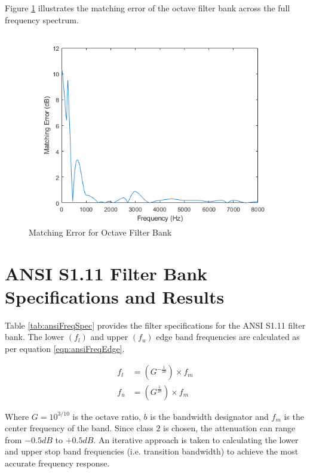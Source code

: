 \documentclass[11pt,onecolumn]{witseiepaper}
\begin{document}
\begin{appendices}
\noindent Figure \ref{fig:octMatErr} illustrates the matching error of the octave filter bank across the full frequency spectrum.

\begin{figure}[h]
\centering
\includegraphics[width=0.6\linewidth]{octMatErr.PNG}
\caption{Matching Error for Octave Filter Bank}
\label{fig:octMatErr}
\end{figure}  


\section{ANSI S1.11 Filter Bank Specifications and Results}
\label{app:ansiSpec}

\noindent Table \ref{tab:ansiFreqSpec} provides the filter specifications for the ANSI S1.11 filter bank. The lower $(f_l)$ and upper $(f_u)$ edge band frequencies are calculated as per equation \ref{eqn:ansiFreqEdge}.

\begin{equation}
\label{eqn:ansiFreqEdge}
\begin{aligned}
f_l &= (G^{-\frac{1}{2b}}) \times f_m \\
f_u &= (G^{\frac{1}{2b}}) \times f_m
\end{aligned}
\end{equation}

\noindent Where $G = 10^{3/10}$ is the octave ratio, $b$ is the bandwidth designator and $f_m$ is the center frequency of the band. Since class $2$ is chosen, the attenuation can range from $-0.5dB$ to $+0.5dB$. An iterative approach is taken to calculating the lower and upper stop band frequencies (i.e. transition bandwidth) to achieve the most accurate frequency response.	


\end{appendices}
\end{document}
